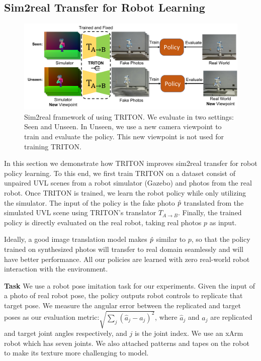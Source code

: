 \documentclass{article}
\begin{document}
\subsection{Sim2real Transfer for Robot Learning}
\label{sec:robotarm_results}
\begin{figure}[thbp]
    \centering
    \vspace{-10pt}
    \includegraphics[width=\textwidth]{../images/sim2real_framework.pdf}
    \vspace{-10pt}
    \caption{Sim2real framework of using TRITON. We evaluate in two settings: Seen and Unseen. In Unseen, we use a new camera viewpoint to train and evaluate the policy. This new viewpoint is not used for training TRITON. }
    \vspace{-5pt}
    \label{fig:sim2realframework}
\end{figure}
In this section we demonstrate how TRITON improves sim2real transfer for robot policy learning. To this end, we first train TRITON on a dataset consist of unpaired UVL scenes from a robot simulator (Gazebo) and photos from the real robot. Once TRITON is trained, we learn the robot policy while only utilizing the simulator. The input of the policy is the fake photo $\hat{p}$ translated from the simulated UVL scene using TRITON's translator $T_{A\to B}$. Finally, the trained policy is directly evaluated on the real robot, taking real photos $p$ as input.

Ideally, a good image translation model makes $\hat{p}$ similar to $p$, so that the policy trained on synthesized photos will transfer to real domain seamlessly and will have better performance. All our policies are learned with zero real-world robot interaction with the environment.

\textbf{Task} We use a robot pose imitation task for our experiments. Given the input of a photo of real robot pose, the policy outputs robot controls to replicate that target pose. We measure the angular error between the replicated and target poses as our evaluation metric:$\sqrt{\sum_{j} (\hat{a}_j - a_j)^2}$,
where $\hat{a}_j$ and $a_j$ are replicated and target joint angles respectively, and $j$ is the joint index. We use an xArm robot which has seven joints. We also attached patterns and tapes on the robot to make its texture more challenging to model.
\end{document}

